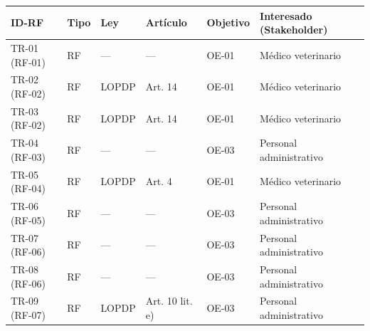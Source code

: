 \documentclass[
]{article}
\newcounter{none} %
\begin{document}
{\def\LTcaptype{none} %
\begin{longtable}[]{|
  >{\centering\arraybackslash}p{}|
  >{\centering\arraybackslash}p{}|
  >{\raggedright\arraybackslash}p{}|
  >{\raggedright\arraybackslash}p{}|
  >{\centering\arraybackslash}p{}|
  >{\raggedright\arraybackslash}p{}|}
\hline
\begin{minipage}[b]{\linewidth}\centering
\textbf{ID-RF}
\end{minipage} & \begin{minipage}[b]{\linewidth}\centering
\textbf{Tipo}
\end{minipage} & \begin{minipage}[b]{\linewidth}\raggedright
\textbf{Ley}
\end{minipage} & \begin{minipage}[b]{\linewidth}\raggedright
\textbf{Artículo}
\end{minipage} & \begin{minipage}[b]{\linewidth}\centering
\textbf{Objetivo}
\end{minipage} & \begin{minipage}[b]{\linewidth}\raggedright
\textbf{Interesado (Stakeholder)}
\end{minipage} \\
\hline
\endhead
\hline
\endlastfoot
TR-01 (RF-01) & RF & — & — & OE-01 & Médico veterinario \\
\hline
TR-02 (RF-02) & RF & LOPDP & Art. 14 & OE-01 & Médico veterinario \\
\hline
TR-03 (RF-02) & RF & LOPDP & Art. 14 & OE-01 & Médico veterinario \\
\hline
TR-04 (RF-03) & RF & — & — & OE-03 & Personal administrativo \\
\hline
TR-05 (RF-04) & RF & LOPDP & Art. 4 & OE-01 & Médico veterinario \\
\hline
TR-06 (RF-05) & RF & — & — & OE-03 & Personal administrativo \\
\hline
TR-07 (RF-06) & RF & — & — & OE-03 & Personal administrativo \\
\hline
TR-08 (RF-06) & RF & — & — & OE-03 & Personal administrativo \\
\hline
TR-09 (RF-07) & RF & LOPDP & Art. 10 lit. e) & OE-03 & Personal administrativo \\

\end{longtable}}
\end{document}
